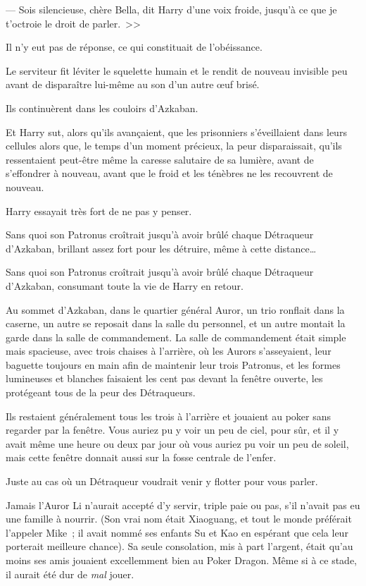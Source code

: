 --- Sois silencieuse, chère Bella, dit Harry d'une voix froide, jusqu'à ce que je t'octroie le droit de parler.~>>

Il n'y eut pas de réponse, ce qui constituait de l'obéissance.

Le serviteur fit léviter le squelette humain et le rendit de nouveau invisible peu avant de disparaître lui-même au son d'un autre œuf brisé.

Ils continuèrent dans les couloirs d'Azkaban.

Et Harry sut, alors qu'ils avançaient, que les prisonniers s'éveillaient dans leurs cellules alors que, le temps d'un moment précieux, la peur disparaissait, qu'ils ressentaient peut-être même la caresse salutaire de sa lumière, avant de s'effondrer à nouveau, avant que le froid et les ténèbres ne les recouvrent de nouveau.

Harry essayait très fort de ne pas y penser.

Sans quoi son Patronus croîtrait jusqu'à avoir brûlé chaque Détraqueur d'Azkaban, brillant assez fort pour les détruire, même à cette distance…

Sans quoi son Patronus croîtrait jusqu'à avoir brûlé chaque Détraqueur d'Azkaban, consumant toute la vie de Harry en retour.

\later

Au sommet d'Azkaban, dans le quartier général Auror, un trio ronflait dans la caserne, un autre se reposait dans la salle du personnel, et un autre montait la garde dans la salle de commandement. La salle de commandement était simple mais spacieuse, avec trois chaises à l'arrière, où les Aurors s'asseyaient, leur baguette toujours en main afin de maintenir leur trois Patronus, et les formes lumineuses et blanches faisaient les cent pas devant la fenêtre ouverte, les protégeant tous de la peur des Détraqueurs.

Ils restaient généralement tous les trois à l'arrière et jouaient au poker sans regarder par la fenêtre. Vous auriez pu y voir un peu de ciel, pour sûr, et il y avait même une heure ou deux par jour où vous auriez pu voir un peu de soleil, mais cette fenêtre donnait aussi sur la fosse centrale de l'enfer.

Juste au cas où un Détraqueur voudrait venir y flotter pour vous parler.

Jamais l'Auror Li n'aurait accepté d'y servir, triple paie ou pas, s'il n'avait pas eu une famille à nourrir. (Son vrai nom était Xiaoguang, et tout le monde préférait l'appeler Mike~; il avait nommé ses enfants Su et Kao en espérant que cela leur porterait meilleure chance). Sa seule consolation, mis à part l'argent, était qu'au moins ses amis jouaient excellemment bien au Poker Dragon. Même si à ce stade, il aurait été dur de \emph{mal} jouer.

